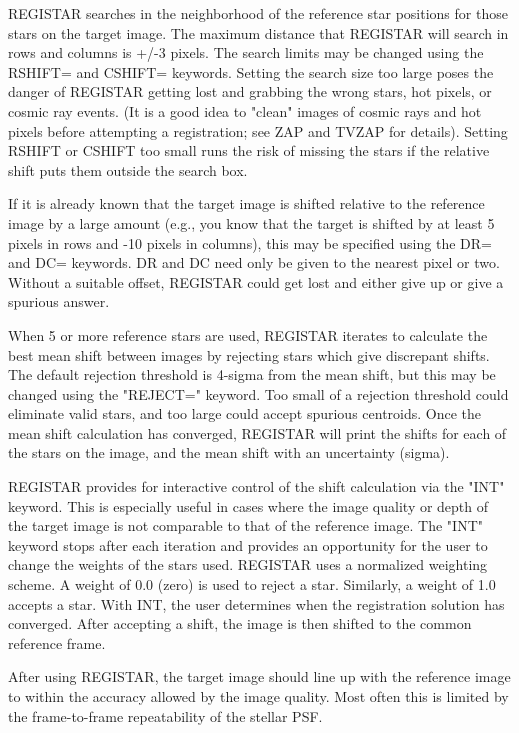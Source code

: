 REGISTAR searches in the neighborhood of the reference star positions for
those stars on the target image.  The maximum distance that REGISTAR will
search in rows and columns is +/-3 pixels.  The search limits may be
changed using the RSHIFT= and CSHIFT= keywords.  Setting the search size
too large poses the danger of REGISTAR getting lost and grabbing the wrong
stars, hot pixels, or cosmic ray events.  (It is a good idea to "clean"
images of cosmic rays and hot pixels before attempting a registration; see
ZAP and TVZAP for details).  Setting RSHIFT or CSHIFT too small runs the
risk of missing the stars if the relative shift puts them outside the
search box.

If it is already known that the target image is shifted relative to the
reference image by a large amount (e.g., you know that the target is
shifted by at least 5 pixels in rows and -10 pixels in columns), this may
be specified using the DR= and DC= keywords.  DR and DC need only be given
to the nearest pixel or two.  Without a suitable offset, REGISTAR could get
lost and either give up or give a spurious answer.

When 5 or more reference stars are used, REGISTAR iterates to calculate the
best mean shift between images by rejecting stars which give discrepant
shifts.  The default rejection threshold is 4-sigma from the mean shift,
but this may be changed using the "REJECT=" keyword.  Too small of a
rejection threshold could eliminate valid stars, and too large could accept
spurious centroids.  Once the mean shift calculation has converged,
REGISTAR will print the shifts for each of the stars on the image, and the
mean shift with an uncertainty (sigma).

REGISTAR provides for interactive control of the shift calculation via the
"INT" keyword.  This is especially useful in cases where the image quality
or depth of the target image is not comparable to that of the reference
image.  The "INT" keyword stops after each iteration and provides an
opportunity for the user to change the weights of the stars used.  REGISTAR
uses a normalized weighting scheme.  A weight of 0.0 (zero) is used to
reject a star.  Similarly, a weight of 1.0 accepts a star.  With INT, the
user determines when the registration solution has converged.  After
accepting a shift, the image is then shifted to the common reference frame.

After using REGISTAR, the target image should line up with the reference
image to within the accuracy allowed by the image quality.  Most often this
is limited by the frame-to-frame repeatability of the stellar PSF.

